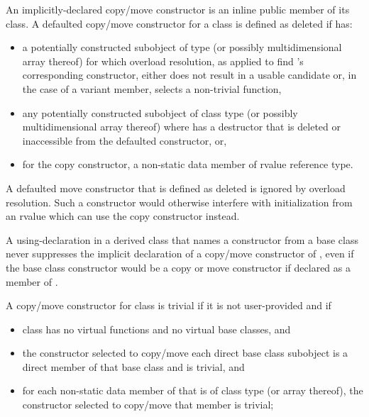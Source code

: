 \pnum
An implicitly-declared copy/move constructor is an
inline public member of its class.
A defaulted copy/\brk{}move constructor for a class
   is defined as deleted if  has:
\begin{itemize}
\item a potentially constructed subobject of type
   (or possibly multidimensional array thereof) for which
  overload resolution, as applied to find
  's corresponding constructor,
  either does not result in a usable candidate or,
  in the case of a variant member, selects a non-trivial function,

\item any potentially constructed subobject of
  class type  (or possibly multidimensional array thereof)
  where  has
  a destructor that is deleted or inaccessible from the defaulted
  constructor, or,

\item for the copy constructor, a non-static data member of rvalue reference type.
\end{itemize}

\begin{note}
A defaulted move constructor that is defined as deleted is ignored by overload
resolution.
Such a constructor would otherwise interfere with initialization from
an rvalue which can use the copy constructor instead.
\end{note}

\pnum
\begin{note}
A using-declaration in a derived class  that
names a constructor from a base class
never suppresses the implicit declaration of
a copy/move constructor of ,
even if the base class constructor would be
a copy or move constructor
if declared as a member of .
\end{note}

\pnum
{}%
%
A copy/move constructor for class
is
trivial
if it is not user-provided and if
\begin{itemize}
\item
class
has no virtual functions
and no virtual base classes, and

\item
the constructor selected to copy/move each direct base class subobject
is a direct member of that base class and is trivial, and

\item
for each non-static data member of
that is of class type (or array thereof),
the constructor selected to copy/move that member is trivial;
\end{itemize}

